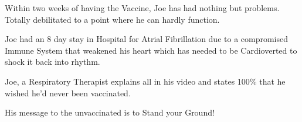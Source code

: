 Within two weeks of having the Vaccine, Joe has had nothing but
problems. Totally debilitated to a point where he can hardly function.

Joe had an 8 day stay in Hospital for Atrial Fibrillation due to a compromised
Immune System that weakened his heart which has needed to be Cardioverted to
shock it back into rhythm.

Joe, a Respiratory Therapist explains all in his video and states 100\% that he
wished he'd never been vaccinated.

His message to the unvaccinated is to Stand your Ground!

